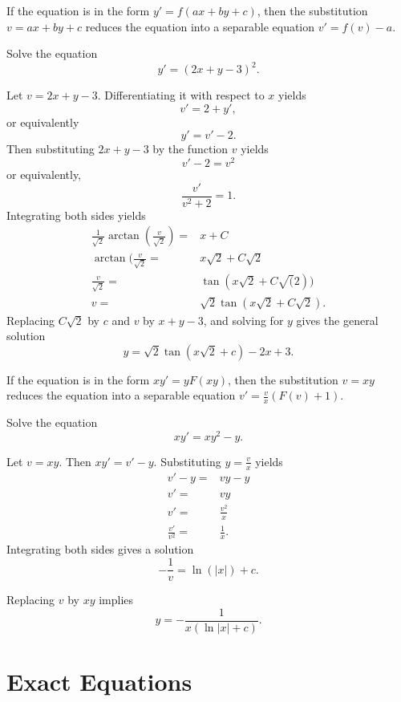 If the equation is in the form $y'=f(ax+by+c)$, then the substitution $v=ax+by+c$ reduces the equation into a separable equation $v'=f(v)-a$.

\begin{example}
  Solve the equation
  \[y'= (2x+y-3)^2.\]
\end{example}
\begin{solution}
  Let $v=2x+y-3$. Differentiating it with respect to $x$ yields
\[v'=2+y',\]
or equivalently
\[y'=v'- 2.\]
Then substituting $2x+y-3$ by the function $v$ yields
\[v'-2=v^2\]
or equivalently,
\[\frac{v'}{v^2+2}=1.\]
Integrating both sides yields
\[
  \begin{aligned}
    \frac{1}{\sqrt{2}}\arctan(\frac{v}{\sqrt{2}})=&x+C\\
    \arctan(\frac{v}{\sqrt{2}}=&x\sqrt{2} + C\sqrt{2}\\
    \frac{v}{\sqrt{2}}=&\tan(x\sqrt{2} + C\sqrt(2))\\
    v=&\sqrt{2}\tan(x\sqrt{2} + C\sqrt{2}).
\end{aligned}
  \]
 Replacing $C\sqrt{2}$ by $c$ and $v$ by $x+y-3$, and solving for $y$ gives the general solution
\[
y= \sqrt{2}\tan(x\sqrt{2} + c) - 2x + 3.
\]
\end{solution}

If the equation is in the form $xy'=yF(xy)$, then the substitution $v=xy$ reduces the equation into a separable equation $v'=\frac{v}{x}(F(v)+1).$

\begin{example}
  Solve the equation
  \[xy'=xy^2-y.\]
\end{example}
\begin{solution}
  Let $v=xy$. Then $xy'=v'-y$. Substituting $y=\frac{v}{x}$ yields
  \[
  \begin{aligned}
    v'-y=&vy-y\\
    v'=&vy\\
    v'=&\frac{v^2}{x}\\
    \frac{v'}{v^2}=&\frac1x.
  \end{aligned}  
  \]
  Integrating both sides gives a solution
  \[
  -\frac1v=\ln(|x|)+c.  
  \]
  
  Replacing $v$ by $xy$ implies
  \[y=-\frac1{x(\ln|x|+c)}.\]
\end{solution}


\section{Exact Equations}

